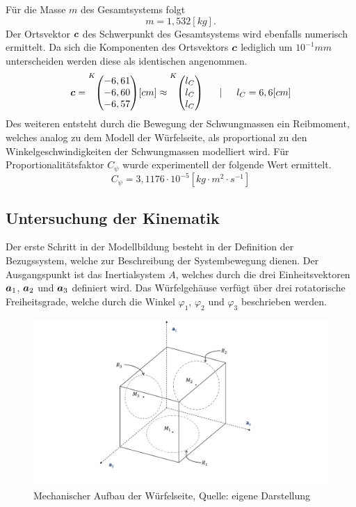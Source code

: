 Für die Masse $m$ des Gesamtsystems folgt
\begin{equation}
m = 1,532[kg].
\end{equation}
Der Ortsvektor $\boldsymbol{c}$ des Schwerpunkt des Gesamtsystems wird ebenfalls numerisch ermittelt. Da sich die Komponenten des Ortsvektors $\boldsymbol{c}$ lediglich um $10^{-1}mm$ unterscheiden werden diese als identischen angenommen.
\begin{equation}
\bs{c} = \vecBS{K}{-6,61}{-6,60}{-6,57}[cm] \approx \vecBS{K}{l_C}{l_C}{l_C} \hspace{15pt} \vert \hspace{15pt} l_C = 6,6[cm]
\end{equation}
Des weiteren entsteht durch die Bewegung der Schwungmassen ein Reibmoment, welches analog zu dem Modell der Würfelseite, als proportional zu den Winkelgeschwindigkeiten der Schwungmassen modelliert wird. Für Proportionalitätsfaktor $C_{\psi}$ wurde experimentell der folgende Wert ermittelt.
\begin{equation}
C_{\psi} = 3,1176\cdot 10^{-5}[kg\cdot m^2 \cdot s^{-1}]
\end{equation}

\subsection{Untersuchung der Kinematik}
Der erste Schritt in der Modellbildung besteht in der Definition der Bezugssystem, welche zur Beschreibung der Systembewegung dienen. Der Ausgangspunkt ist das Inertialsystem $A$, welches durch die drei Einheitsvektoren $\boldsymbol{a}_1$, $\boldsymbol{a}_2$ und $\boldsymbol{a}_3$ definiert wird. Das Würfelgehäuse verfügt über drei rotatorische Freiheitsgrade, welche durch die Winkel $\varphi_1$, $\varphi_2$ und $\varphi_3$ beschrieben werden. 

\begin{figure}[!h]
\centering
\includegraphics[width=\linewidth, trim={3cm 1.5cm 4cm 0cm}, clip]{5_ModellWuerfel/img/MechAufbau3D}
\caption{Mechanischer Aufbau der Würfelseite, Quelle: eigene Darstellung}
\end{figure}

